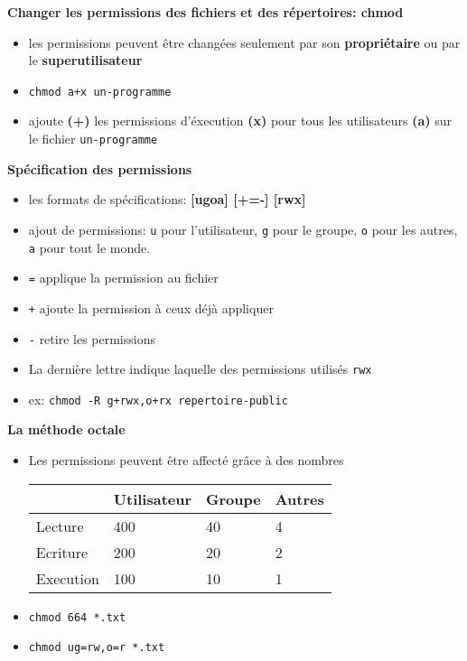 \documentclass[french]{beamer}
\begin{document}
\begin{frame}
\textbf{Changer les permissions des fichiers et des répertoires: chmod }
\begin{itemize}
\item les permissions peuvent être changées seulement par son \textbf{propriétaire} ou par le \textbf{superutilisateur}
\item \texttt{chmod a+x un-programme}
\item ajoute \textbf{(+)} les permissions d'éxecution \textbf{(x)} pour tous les
utilisateurs \textbf{(a)} sur le fichier \texttt{un-programme}
\end{itemize}
\end{frame}

\begin{frame}
\textbf{Spécification des permissions}
\begin{itemize}
\item les formats de spécifications:
\textbf{[ugoa] [+=-] [rwx]}
\item ajout de permissions: \texttt{u} pour l'utilisateur, \texttt{g} pour le
groupe, \texttt{o} pour les autres, \texttt{a} pour tout le monde.
\item \texttt{=} applique la permission au fichier
\item \texttt{+} ajoute la permission à ceux déjà appliquer
\item \texttt{-} retire les permissions
\item La dernière lettre indique laquelle des permissions utilisés \texttt{rwx}
\item ex: \texttt{chmod -R g+rwx,o+rx repertoire-public}
\end{itemize}
\end{frame}

\begin{frame}
\textbf{La méthode octale}
\begin{itemize}
    \item Les permissions peuvent être affecté grâce à des nombres
    \begin{tabular}{|l|l|l|l|}
       \hline
       & \textbf{Utilisateur} & \textbf{Groupe} & \textbf{Autres} \\
       \hline
       Lecture & 400 & 40 & 4 \\
       Ecriture & 200 & 20 & 2 \\
       Execution & 100 & 10 & 1 \\
       \hline
    \end{tabular}
    \item \texttt{chmod 664 *.txt}
    \item \texttt{chmod ug=rw,o=r *.txt}
    \end{itemize}
\end{frame}
\end{document}
